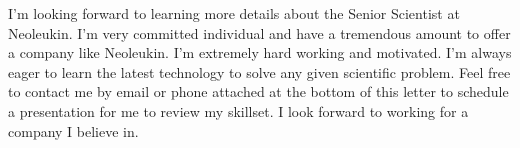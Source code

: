 \documentclass[11pt,a4paper,sans]{moderncv}        %
\newcommand{\Position}{Senior Scientist }
\newcommand{\Company}{Neoleukin}
\begin{document}
I'm looking forward to learning more details about the \Position at \Company. I'm very committed individual and have a tremendous amount to offer a company like \Company. I'm extremely hard working and motivated. I'm always eager to learn the latest technology to solve any given scientific problem. Feel free to contact me by email or phone attached at the bottom of this letter to schedule a presentation for me to review my skillset. I look forward to working for a company I believe in. 

\makeletterclosing
\end{document}
